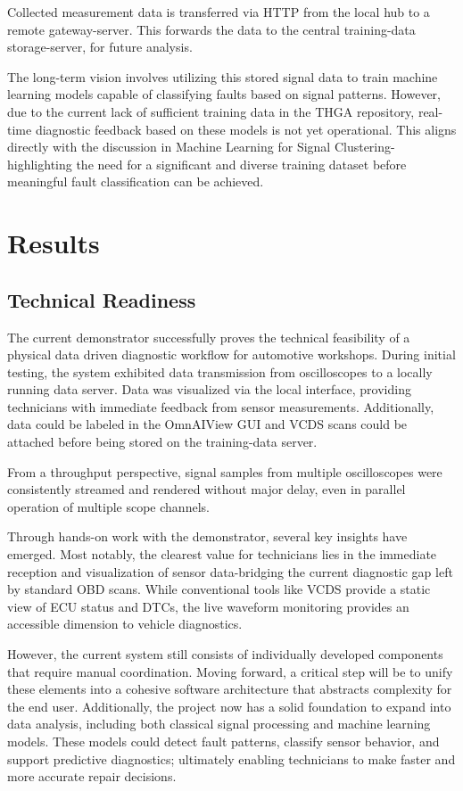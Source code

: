 Collected measurement data is transferred via HTTP from the local hub to a remote gateway-server. 
This forwards the data to the central training-data storage-server, for future analysis. 

The long-term vision involves utilizing this stored signal data to train machine learning models capable of classifying faults based on signal patterns. 
However, due to the current lack of sufficient training data in the THGA repository, real-time diagnostic feedback based on these models is not yet operational. 
This aligns directly with the discussion in Machine Learning for Signal Clustering-highlighting the need for a significant and diverse training dataset before meaningful fault classification can be achieved.




\section{Results}
\subsection{Technical Readiness}
The current demonstrator successfully proves the technical feasibility of a physical data driven diagnostic workflow for automotive workshops. 
During initial testing, the system exhibited data transmission from oscilloscopes to a locally running data server.
Data was visualized via the local interface, providing technicians with immediate feedback from sensor measurements.
Additionally, data could be labeled in the OmnAIView GUI and VCDS scans could be attached before being stored on the training-data server.

From a throughput perspective, signal samples from multiple oscilloscopes were consistently streamed and rendered without major delay, even in parallel operation of multiple scope channels. 

Through hands-on work with the demonstrator, several key insights have emerged. 
Most notably, the clearest value for technicians lies in the immediate reception and visualization of sensor data-bridging the current diagnostic gap left by standard OBD scans. 
While conventional tools like VCDS provide a static view of ECU status and DTCs, the live waveform monitoring provides an accessible dimension to vehicle diagnostics.

However, the current system still consists of individually developed components that require manual coordination. 
Moving forward, a critical step will be to unify these elements into a cohesive software architecture that abstracts complexity for the end user. 
Additionally, the project now has a solid foundation to expand into data analysis, including both classical signal processing and machine learning models. 
These models could detect fault patterns, classify sensor behavior, and support predictive diagnostics; ultimately enabling technicians to make faster and more accurate repair decisions.



